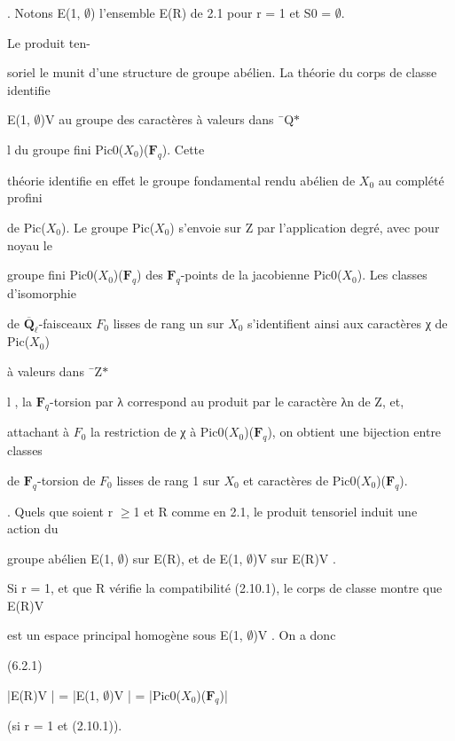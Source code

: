 \documentclass[11pt]{article}
\begin{document}
. Notons E(1, \(\emptyset\)) l’ensemble E(R) de 2.1 pour r = 1 et S0 = \(\emptyset\).\par
\noindent Le produit ten-\par
\noindent soriel le munit d’une structure de groupe abélien. La théorie du corps de classe identifie\par
\medskip
\noindent E(1, \(\emptyset\))V au groupe des caractères à valeurs dans ¯Q\(*\)\par
\noindent l du groupe fini Pic0(\(X_0\))(\(\mathbf F_q\)). Cette\par
\noindent théorie identifie en effet le groupe fondamental rendu abélien de \(X_0\) au complété profini\par
\noindent de Pic(\(X_0\)). Le groupe Pic(\(X_0\)) s’envoie sur Z par l’application degré, avec pour noyau le\par
\noindent groupe fini Pic0(\(X_0\))(\(\mathbf F_q\)) des \(\mathbf F_q\)-points de la jacobienne Pic0(\(X_0\)). Les classes d’isomorphie\par
\noindent de \(\overline{\mathbf Q}_{\ell}\)-faisceaux \(F_0\) lisses de rang un sur \(X_0\) s’identifient ainsi aux caractères χ de Pic(\(X_0\))\par
\noindent à valeurs dans ¯Z\(*\)\par
\noindent l , la \(\mathbf F_q\)-torsion par λ correspond au produit par le caractère λn de Z, et,\par
\noindent attachant à \(F_0\) la restriction de χ à Pic0(\(X_0\))(\(\mathbf F_q\)), on obtient une bijection entre classes\par
\noindent de \(\mathbf F_q\)-torsion de \(F_0\) lisses de rang 1 sur \(X_0\) et caractères de Pic0(\(X_0\))(\(\mathbf F_q\)).\par
{}. Quels que soient r \(\geq\)1 et R comme en 2.1, le produit tensoriel induit une action du\par
\noindent groupe abélien E(1, \(\emptyset\)) sur E(R), et de E(1, \(\emptyset\))V sur E(R)V .\par
\noindent Si r = 1, et que R vérifie la compatibilité (2.10.1), le corps de classe montre que E(R)V\par
\noindent est un espace principal homogène sous E(1, \(\emptyset\))V . On a donc\par
\noindent (6.2.1)\par
\noindent |E(R)V | = |E(1, \(\emptyset\))V | = |Pic0(\(X_0\))(\(\mathbf F_q\))|\par
\noindent (si r = 1 et (2.10.1)).\par
\end{document}
